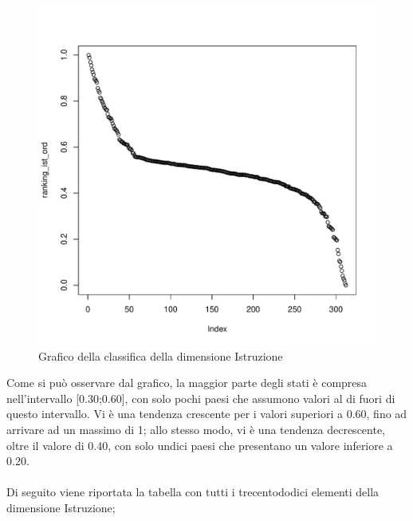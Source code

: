 \documentclass[a4paper,12pt, openright]{report}
\begin{document}
\begin{figure}[H]
    \centering
    \includegraphics[scale=.5]{ranking_ist_norm.pdf}
    \caption{Grafico della classifica della dimensione Istruzione}
\end{figure}

Come si può osservare dal grafico, la maggior parte degli stati è compresa nell'intervallo [0.30;0.60], con solo pochi paesi che assumono valori al di fuori 
di questo intervallo. Vi è una tendenza crescente per i valori superiori a 0.60, fino ad arrivare ad un massimo di 1; allo stesso modo, vi è
una tendenza decrescente, oltre il valore di 0.40, con solo undici paesi che presentano un valore inferiore a 0.20. \\
\\
Di seguito viene riportata la tabella con tutti i trecentododici elementi della dimensione Istruzione; \\
\end{document}
